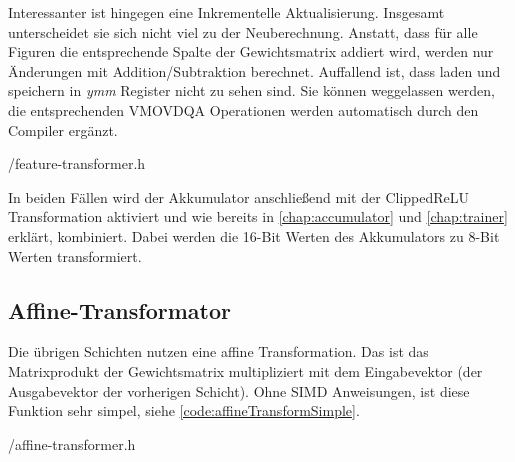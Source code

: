 Interessanter ist hingegen eine Inkrementelle Aktualisierung. Insgesamt unterscheidet sie sich nicht viel zu der Neuberechnung. Anstatt, dass für alle Figuren die entsprechende Spalte der Gewichtsmatrix addiert wird, werden nur Änderungen mit Addition/Subtraktion berechnet. Auffallend ist, dass laden und speichern in \emph{ymm} Register nicht zu sehen sind. Sie können weggelassen werden, die entsprechenden VMOVDQA Operationen werden automatisch durch den Compiler ergänzt.


{\srcloc/feature-transformer.h}

In beiden Fällen wird der Akkumulator anschließend mit der Clipped\ac{ReLU} Transformation aktiviert und wie bereits in \autoref{chap:accumulator} und \autoref{chap:trainer} erklärt, kombiniert. Dabei werden die 16-Bit Werten des Akkumulators zu 8-Bit Werten transformiert.

% 

\subsection{Affine-Transformator}

Die übrigen Schichten nutzen eine affine Transformation. Das ist das Matrixprodukt der Gewichtsmatrix multipliziert mit dem Eingabevektor (der Ausgabevektor der vorherigen Schicht). Ohne \ac{SIMD} Anweisungen, ist diese Funktion sehr simpel, siehe \autoref{code:affineTransformSimple}. 


{\srcloc/affine-transformer.h}

